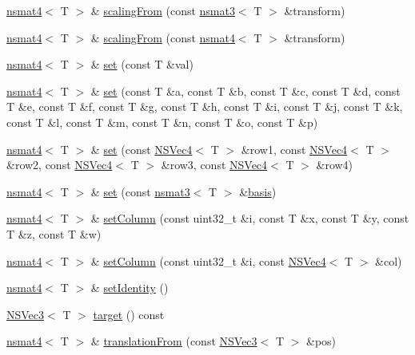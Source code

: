 \begin{DoxyCompactItemize}
\item 
\hyperlink{structnsmat4}{nsmat4}$<$ T $>$ \& \hyperlink{structnsmat4_a457fb11f39e444b606c5979b9eae99c5}{scaling\-From} (const \hyperlink{structnsmat3}{nsmat3}$<$ T $>$ \&transform)
\item 
\hyperlink{structnsmat4}{nsmat4}$<$ T $>$ \& \hyperlink{structnsmat4_a44eb631abda0a85c3f230793eeafa2ff}{scaling\-From} (const \hyperlink{structnsmat4}{nsmat4}$<$ T $>$ \&transform)
\item 
\hyperlink{structnsmat4}{nsmat4}$<$ T $>$ \& \hyperlink{structnsmat4_a8a89b6c95ef9aede01a6ac868272cc69}{set} (const T \&val)
\item 
\hyperlink{structnsmat4}{nsmat4}$<$ T $>$ \& \hyperlink{structnsmat4_abaef1829d6de2a0175688b41f72c7d13}{set} (const T \&a, const T \&b, const T \&c, const T \&d, const T \&e, const T \&f, const T \&g, const T \&h, const T \&i, const T \&j, const T \&k, const T \&l, const T \&m, const T \&n, const T \&o, const T \&p)
\item 
\hyperlink{structnsmat4}{nsmat4}$<$ T $>$ \& \hyperlink{structnsmat4_adad98385fa534db92acfccbd5f5b34f9}{set} (const \hyperlink{structNSVec4}{N\-S\-Vec4}$<$ T $>$ \&row1, const \hyperlink{structNSVec4}{N\-S\-Vec4}$<$ T $>$ \&row2, const \hyperlink{structNSVec4}{N\-S\-Vec4}$<$ T $>$ \&row3, const \hyperlink{structNSVec4}{N\-S\-Vec4}$<$ T $>$ \&row4)
\item 
\hyperlink{structnsmat4}{nsmat4}$<$ T $>$ \& \hyperlink{structnsmat4_a7c5f43ad6bcff1b9d3958e94438931e5}{set} (const \hyperlink{structnsmat3}{nsmat3}$<$ T $>$ \&\hyperlink{structnsmat4_ac112fb2077156ddeac42c213f67931a4}{basis})
\item 
\hyperlink{structnsmat4}{nsmat4}$<$ T $>$ \& \hyperlink{structnsmat4_a33f1e1fad0e42d77e7c1622a6183903e}{set\-Column} (const uint32\-\_\-t \&i, const T \&x, const T \&y, const T \&z, const T \&w)
\item 
\hyperlink{structnsmat4}{nsmat4}$<$ T $>$ \& \hyperlink{structnsmat4_a430bd56f6ce80a86866001d4df220eec}{set\-Column} (const uint32\-\_\-t \&i, const \hyperlink{structNSVec4}{N\-S\-Vec4}$<$ T $>$ \&col)
\item 
\hyperlink{structnsmat4}{nsmat4}$<$ T $>$ \& \hyperlink{structnsmat4_ad5ce2d95a6a5ce54d00e2837fb4c8578}{set\-Identity} ()
\item 
\hyperlink{structNSVec3}{N\-S\-Vec3}$<$ T $>$ \hyperlink{structnsmat4_a908bdf6e5053eebee849e3fec4dbc4f2}{target} () const 
\item 
\hyperlink{structnsmat4}{nsmat4}$<$ T $>$ \& \hyperlink{structnsmat4_abd921a0e902e0056ebfecde537016743}{translation\-From} (const \hyperlink{structNSVec3}{N\-S\-Vec3}$<$ T $>$ \&pos)

\end{DoxyCompactItemize}
